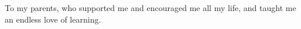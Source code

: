 
\begin{center}
To my parents, who supported me and encouraged me all my life, and taught me an endless love of learning.
\end{center}
